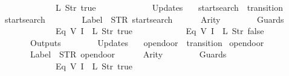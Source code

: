 \begin{isabellebody}
\ \ \ \ \ \ \ \ \ \ \ \ {\isacharparenleft}L\ {\isacharparenleft}Str\ {\isacharprime}{\isacharprime}true{\isacharprime}{\isacharprime}{\isacharparenright}{\isacharparenright}\isanewline
\ \ \ \ \ \ {\isacharbrackright}{\isacharcomma}\isanewline
\ \ \ \ \ \ Updates\ {\isacharequal}\ {\isacharbrackleft}{\isacharbrackright}\isanewline
{\isasymrparr}{\isachardoublequoteclose}\isanewline
\isanewline
{}\isamarkupfalse%
\ {\isachardoublequoteopen}startsearch{\isachardoublequoteclose}\ {\isacharcolon}{\isacharcolon}\ {\isachardoublequoteopen}transition{\isachardoublequoteclose}\ \isanewline
{\isachardoublequoteopen}startsearch\ {\isasymequiv}\ {\isasymlparr}\isanewline
\ \ \ \ \ \ Label\ {\isacharequal}\ STR\ {\isacharprime}{\isacharprime}startsearch{\isacharprime}{\isacharprime}{\isacharcomma}\isanewline
\ \ \ \ \ \ Arity\ {\isacharequal}\ {}{\isacharcomma}\isanewline
\ \ \ \ \ \ Guards\ {\isacharequal}\ {\isacharbrackleft}\isanewline
\ \ \ \ \ \ \ \ \ \ \ \ {\isacharparenleft}Eq\ {\isacharparenleft}V\ {\isacharparenleft}I\ {}{\isacharparenright}{\isacharparenright}\ {\isacharparenleft}L\ {\isacharparenleft}Str\ {\isacharprime}{\isacharprime}true{\isacharprime}{\isacharprime}{\isacharparenright}{\isacharparenright}{\isacharparenright}{\isacharcomma}\isanewline
\ \ \ \ \ \ \ \ \ \ \ \ {\isacharparenleft}Eq\ {\isacharparenleft}V\ {\isacharparenleft}I\ {}{\isacharparenright}{\isacharparenright}\ {\isacharparenleft}L\ {\isacharparenleft}Str\ {\isacharprime}{\isacharprime}false{\isacharprime}{\isacharprime}{\isacharparenright}{\isacharparenright}{\isacharparenright}\isanewline
\ \ \ \ \ \ {\isacharbrackright}{\isacharcomma}\isanewline
\ \ \ \ \ \ Outputs\ {\isacharequal}\ {\isacharbrackleft}{\isacharbrackright}{\isacharcomma}\isanewline
\ \ \ \ \ \ Updates\ {\isacharequal}\ {\isacharbrackleft}{\isacharbrackright}\isanewline
{\isasymrparr}{\isachardoublequoteclose}\isanewline
\isanewline
{}\isamarkupfalse%
\ {\isachardoublequoteopen}opendoor{}{\isachardoublequoteclose}\ {\isacharcolon}{\isacharcolon}\ {\isachardoublequoteopen}transition{\isachardoublequoteclose}\ \isanewline
{\isachardoublequoteopen}opendoor{}\ {\isasymequiv}\ {\isasymlparr}\isanewline
\ \ \ \ \ \ Label\ {\isacharequal}\ STR\ {\isacharprime}{\isacharprime}opendoor{\isacharprime}{\isacharprime}{\isacharcomma}\isanewline
\ \ \ \ \ \ Arity\ {\isacharequal}\ {}{\isacharcomma}\isanewline
\ \ \ \ \ \ Guards\ {\isacharequal}\ {\isacharbrackleft}\isanewline
\ \ \ \ \ \ \ \ \ \ \ \ {\isacharparenleft}Eq\ {\isacharparenleft}V\ {\isacharparenleft}I\ {}{\isacharparenright}{\isacharparenright}\ {\isacharparenleft}L\ {\isacharparenleft}Str\ {\isacharprime}{\isacharprime}true{\isacharprime}{\isacharprime}{\isacharparenright}{\isacharparenright}{\isacharparenright}\isanewline

\end{isabellebody}

